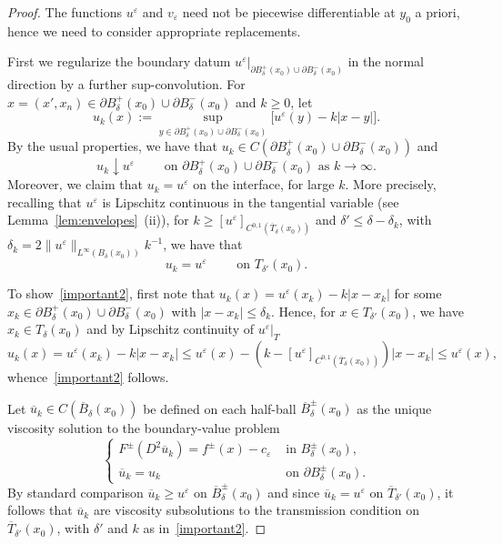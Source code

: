 \documentclass[letter,11pt]{amsart}
\newcommand{\vep}{\varepsilon}
\theoremstyle{definition}
\numberwithin{equation}{section}
\begin{document}
\begin{proof}
\medskip

The functions $u^{\vep}$ and $v_{\vep}$ need not be piecewise differentiable at $y_{0}$ a priori, hence we need to consider appropriate replacements.

\medskip

First we regularize the boundary datum $u^{\vep}|_{\partial B^{+}_{\delta}(x_0) \cup \partial B^{-}_{\delta}(x_0)}$ in the normal direction by a further sup-convolution.
For $x =(x',x_n) \in \partial B^{+}_{\delta}(x_0) \cup \partial B^{-}_{\delta}(x_0)$ and $k \geq 0$, let
\[
u_k(x) := \sup_{y \in \partial B^{+}_{\delta}(x_0) \cup \partial B^{-}_{\delta}(x_0)}\Big[u^{\vep}(y) - k |x - y|\Big].
\]
By the usual properties, we have that $u_k \in C(\partial B^{+}_{\delta}(x_0) \cup \partial B^{-}_{\delta}(x_0))$ and
\begin{equation}
\label{important1}
u_k \downarrow u^{\vep} \qquad \text{ on } \partial B^{+}_{\delta}(x_0) \cup \partial B^{-}_{\delta}(x_0) \text{ as } k \to \infty.
\end{equation}
Moreover, we claim that $u_k = u^{\vep}$ on the interface, for large $k$.
More precisely, recalling that $u^{\vep}$ is Lipschitz continuous in the tangential variable (see Lemma~\ref{lem:envelopes}~(ii)), for $k \geq [u^{\vep}]_{C^{0,1}(\overline{T}_{\delta}(x_0))}$ and $\delta' \leq \delta - \delta_{k}$, with $\delta_{k} = 2 \|u^{\vep}\|_{L^{\infty}(B_{\delta}(x_0))} k^{-1}$, we have that
\begin{equation}
\label{important2}
u_k = u^{\vep} \qquad \text{ on } T_{\delta'}(x_0).
\end{equation}

\medskip

To show~\eqref{important2}, first note that $u_{k}(x) = u^{\vep}(x_k) - k |x - x_k|$ for some $x_k \in \partial B^{+}_{\delta}(x_0) \cup \partial B^{-}_{\delta}(x_0)$ with $|x-x_k| \leq \delta_k$. 
Hence, for $x \in T_{\delta'}(x_0)$, we have $x_k \in T_{\delta}(x_0)$ and by Lipschitz continuity of $u^{\vep}|_{T}$
\[
u_k(x) 
= u^{\vep}(x_k) - k |x- x_k| 
\leq u^{\vep}(x)- (k -  [u^{\vep}]_{C^{0,1}(\overline{T}_{\delta}(x_0))}) |x- x_k| \leq u^{\vep}(x),
\]
whence~\eqref{important2} follows.

\medskip

Let $\overline{u}_k \in C(\overline{B}_{\delta}(x_0))$ be defined on each half-ball $\overline{B}_{\delta}^{\pm}(x_0)$ as the unique viscosity solution to the boundary-value problem
\begin{equation}
\label{ma:bdy}
\begin{cases}
F^{\pm}(D^2 \overline{u}_k) = f^{\pm}(x) - c_{\vep}& \text{ in } B_{\delta}^{\pm}(x_0),\\
\overline{u}_k = u_k & \text{ on } \partial B_{\delta}^{\pm}(x_0).
\end{cases}
\end{equation}
By standard comparison $\overline{u}_k \geq u^{\vep}$ on $\overline{B}_{\delta}^{\pm}(x_0)$ and since $\overline{u}_k = u^{\vep}$ on $\overline{T}_{\delta'}(x_0)$, it follows that $\overline{u}_k$ are viscosity subsolutions to the transmission condition on $\overline{T}_{\delta'}(x_0)$, with $\delta'$ and $k$ as in~\eqref{important2}.


\end{proof}
\end{document}
